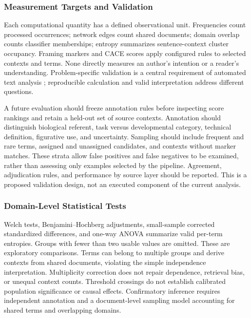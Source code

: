 \documentclass[
]{article}
\numberwithin{equation}{section}
\begin{document}
\subsubsection{Measurement Targets and
Validation}\label{sec:measurement_validation}

Each computational quantity has a defined observational unit.
Frequencies count processed occurrences; network edges count shared
documents; domain overlap counts classifier memberships; entropy
summarizes sentence-context cluster occupancy. Framing markers and CACE
scores apply configured rules to selected contexts and terms. None
directly measures an author's intention or a reader's understanding.
Problem-specific validation is a central requirement of automated text
analysis \citep{grimmer2013text}; reproducible calculation and valid
interpretation address different questions.

A future evaluation should freeze annotation rules before inspecting
score rankings and retain a held-out set of source contexts. Annotation
should distinguish biological referent, task versus developmental
category, technical definition, figurative use, and uncertainty.
Sampling should include frequent and rare terms, assigned and unassigned
candidates, and contexts without marker matches. These strata allow
false positives and false negatives to be examined, rather than
assessing only examples selected by the pipeline. Agreement,
adjudication rules, and performance by source layer should be reported.
This is a proposed validation design, not an executed component of the
current analysis.

\subsubsection{Domain-Level Statistical
Tests}\label{domain-level-statistical-tests}

Welch tests, Benjamini--Hochberg adjustments, small-sample corrected
standardized differences, and one-way ANOVA summarize valid per-term
entropies. Groups with fewer than two usable values are omitted. These
are exploratory comparisons. Terms can belong to multiple groups and
derive contexts from shared documents, violating the simple independence
interpretation. Multiplicity correction does not repair dependence,
retrieval bias, or unequal context counts. Threshold crossings do not
establish calibrated population significance or causal effects.
Confirmatory inference requires independent annotation and a
document-level sampling model accounting for shared terms and
overlapping domains.
\end{document}
